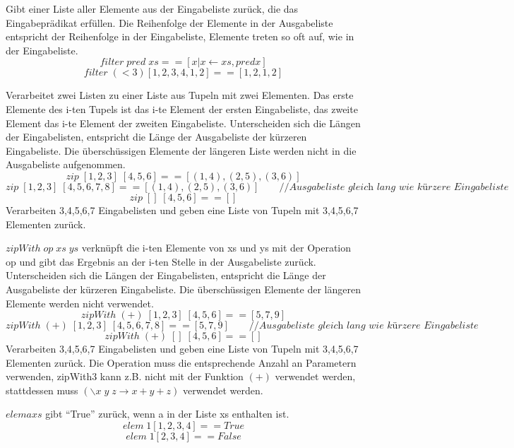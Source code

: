 Gibt einer Liste aller Elemente aus der Eingabeliste zurück, die das Eingabeprädikat erfüllen. Die Reihenfolge der Elemente in der Ausgabeliste entspricht der Reihenfolge in der Eingabeliste, Elemente treten so oft auf, wie in der Eingabeliste.
\equal
$$filter\; pred\; xs == [x | x \leftarrow xs, pred x]$$
\example
$$filter\; (<3) [1,2,3,4,1,2] == [1,2,1,2]$$

Verarbeitet zwei Listen zu einer Liste aus Tupeln mit zwei Elementen. Das erste Elemente des i-ten Tupels ist das i-te Element der ersten Eingabeliste, das zweite Element das i-te Element der zweiten Eingabeliste. Unterscheiden sich die Längen der Eingabelisten, entspricht die Länge der Ausgabeliste der kürzeren Eingabeliste. Die überschüssigen Elemente der längeren Liste werden nicht in die Ausgabeliste aufgenommen.
\example
$$zip\; [1,2,3]\; [4,5,6] == [(1,4), (2,5), (3,6)]$$
$$zip\; [1,2,3]\; [4,5,6,7,8] == [(1,4), (2,5), (3,6)]\qquad \textit{//Ausgabeliste gleich lang wie kürzere Eingabeliste}$$
$$zip\; []\; [4,5,6] == []$$
Verarbeiten 3,4,5,6,7 Eingabelisten und geben eine Liste von Tupeln mit 3,4,5,6,7 Elementen zurück.

$zipWith\; op\; xs\; ys$ verknüpft die i-ten Elemente von xs und ys mit der Operation op und gibt das Ergebnis an der i-ten Stelle in der Ausgabeliste zurück. Unterscheiden sich die Längen der Eingabelisten, entspricht die Länge der Ausgabeliste der kürzeren Eingabeliste. Die überschüssigen Elemente der längeren Elemente werden nicht verwendet.
\example
$$zipWith\; (+)\; [1,2,3]\; [4,5,6] == [5,7,9]$$
$$zipWith\; (+)\; [1,2,3]\; [4,5,6,7,8] == [5,7,9]\qquad \textit{//Ausgabeliste gleich lang wie kürzere Eingabeliste}$$
$$zipWith\; (+)\; []\; [4,5,6] == []$$
Verarbeiten 3,4,5,6,7 Eingabelisten und geben eine Liste von Tupeln mit 3,4,5,6,7 Elementen zurück. Die Operation muss die entsprechende Anzahl an Parametern verwenden, zipWith3 kann z.B. nicht mit der Funktion $(+)$ verwendet werden, stattdessen muss $(\backslash x\; y\; z \rightarrow x + y + z)$ verwendet werden.

$elem a xs$ gibt \enquote{True} zurück, wenn a in der Liste xs enthalten ist.
\example
$$elem\; 1 [1,2,3,4] == True$$
$$elem\; 1 [2,3,4] == False$$

